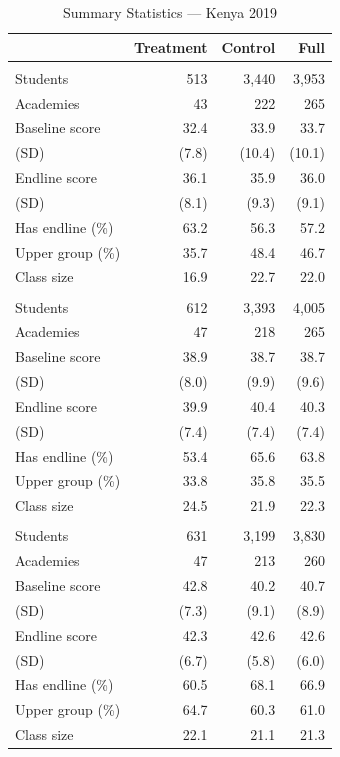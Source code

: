 \begin{table}[htbp]
\centering
\small
\caption{Summary Statistics --- Kenya 2019}
\label{tab:ke2_sumstats}
\begin{tabular}{l*{3}{r}}
\toprule
 & Treatment & Control & Full \\
\midrule
\addlinespace
\multicolumn{4}{l}{\textit{Grade 1}} \\
Students & 513 & 3,440 & 3,953 \\
Academies & 43 & 222 & 265 \\
Baseline score & 32.4 & 33.9 & 33.7 \\
\quad (SD) & (7.8) & (10.4) & (10.1) \\
Endline score & 36.1 & 35.9 & 36.0 \\
\quad (SD) & (8.1) & (9.3) & (9.1) \\
Has endline (\%) & 63.2 & 56.3 & 57.2 \\
Upper group (\%) & 35.7 & 48.4 & 46.7 \\
Class size & 16.9 & 22.7 & 22.0 \\
\addlinespace
\multicolumn{4}{l}{\textit{Grade 2}} \\
Students & 612 & 3,393 & 4,005 \\
Academies & 47 & 218 & 265 \\
Baseline score & 38.9 & 38.7 & 38.7 \\
\quad (SD) & (8.0) & (9.9) & (9.6) \\
Endline score & 39.9 & 40.4 & 40.3 \\
\quad (SD) & (7.4) & (7.4) & (7.4) \\
Has endline (\%) & 53.4 & 65.6 & 63.8 \\
Upper group (\%) & 33.8 & 35.8 & 35.5 \\
Class size & 24.5 & 21.9 & 22.3 \\
\addlinespace
\multicolumn{4}{l}{\textit{Grade 3}} \\
Students & 631 & 3,199 & 3,830 \\
Academies & 47 & 213 & 260 \\
Baseline score & 42.8 & 40.2 & 40.7 \\
\quad (SD) & (7.3) & (9.1) & (8.9) \\
Endline score & 42.3 & 42.6 & 42.6 \\
\quad (SD) & (6.7) & (5.8) & (6.0) \\
Has endline (\%) & 60.5 & 68.1 & 66.9 \\
Upper group (\%) & 64.7 & 60.3 & 61.0 \\
Class size & 22.1 & 21.1 & 21.3 \\
\bottomrule
\end{tabular}
\end{table}